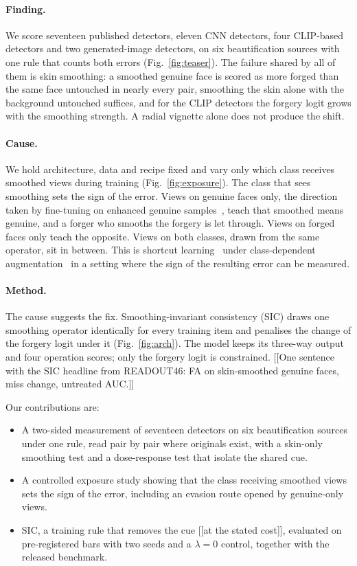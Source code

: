 \paragraph{Finding.} We score seventeen published detectors, eleven CNN detectors, four CLIP-based detectors and two
generated-image detectors, on six beautification sources with one rule that counts both errors (Fig.~\ref{fig:teaser}).
The failure shared by all of them is skin smoothing: a smoothed genuine face is scored as more forged than the same face
untouched in nearly every pair, smoothing the skin alone with the background untouched suffices, and for the CLIP detectors
the forgery logit grows with the smoothing strength. A radial vignette alone does not produce the shift.

\paragraph{Cause.} We hold architecture, data and recipe fixed and vary only which class receives smoothed views during
training (Fig.~\ref{fig:exposure}). The class that sees smoothing sets the sign of the error. Views on genuine faces only,
the direction taken by fine-tuning on enhanced genuine samples~\cite{saeed2025}, teach that smoothed means genuine, and a
forger who smooths the forgery is let through. Views on forged faces only teach the opposite. Views on both classes, drawn
from the same operator, sit in between. This is shortcut learning~\cite{geirhos2020} under class-dependent
augmentation~\cite{balestriero2022} in a setting where the sign of the resulting error can be measured.

\paragraph{Method.} The cause suggests the fix. Smoothing-invariant consistency (SIC) draws one smoothing operator
identically for every training item and penalises the change of the forgery logit under it (Fig.~\ref{fig:arch}). The
model keeps its three-way output and four operation scores; only the forgery logit is constrained. [[One sentence with the
SIC headline from READOUT46: FA on skin-smoothed genuine faces, miss change, untreated AUC.]]

Our contributions are:
\begin{itemize}
\item A two-sided measurement of seventeen detectors on six beautification sources under one rule, read pair by pair where
originals exist, with a skin-only smoothing test and a dose-response test that isolate the shared cue.
\item A controlled exposure study showing that the class receiving smoothed views sets the sign of the error, including an
evasion route opened by genuine-only views.
\item SIC, a training rule that removes the cue [[at the stated cost]], evaluated on pre-registered bars with two seeds and a
$\lambda = 0$ control, together with the released benchmark.
\end{itemize}

